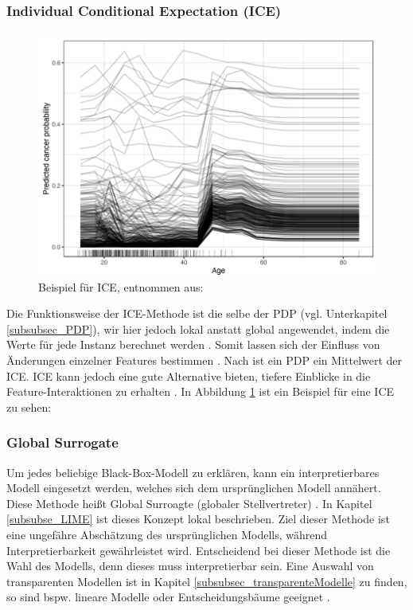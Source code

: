 \subsubsection{Individual Conditional Expectation (ICE)}
\begin{figure}[h]
    \centering
    \includegraphics[scale=0.35]{pic/MA-Bilder/Literaturrecherche/ICE_Beispiel.PNG}
    \caption{Beispiel für ICE, entnommen aus: \cite{ICE-beispiel}}
    \label{Fig:Beispiel_ICE}
\end{figure}
Die Funktionsweise der ICE-Methode ist die selbe der PDP (vgl. Unterkapitel \ref{subsubsec_PDP}), wir hier jedoch lokal anstatt global angewendet, indem die Werte für jede Instanz berechnet werden \cite{molnar2022}. Somit lassen sich der Einfluss von Änderungen einzelner Features bestimmen \cite{hanif2021survey}. Nach \textcite{molnar2022} ist ein PDP ein Mittelwert der ICE. ICE kann jedoch eine gute Alternative bieten, tiefere Einblicke in die Feature-Interaktionen zu erhalten \cite{molnar2022}. In Abbildung \ref{Fig:Beispiel_ICE} ist ein Beispiel für eine ICE zu sehen: 

\subsubsection{Global Surrogate}
Um jedes beliebige Black-Box-Modell zu erklären, kann ein interpretierbares Modell eingesetzt werden, welches sich dem ursprünglichen Modell annähert. Diese Methode heißt Global Surroagte (globaler Stellvertreter) \cite{molnar2022}. In Kapitel \ref{subsubse_LIME} ist dieses Konzept lokal beschrieben. Ziel dieser Methode ist eine ungefähre Abschätzung des ursprünglichen Modells, während Interpretierbarkeit gewährleistet wird. Entscheidend bei dieser Methode ist die Wahl des Modells, denn dieses muss interpretierbar sein. Eine Auswahl von transparenten Modellen ist in Kapitel \ref{subsubsec_transparenteModelle} zu finden, so sind bspw. lineare Modelle oder Entscheidungsbäume geeignet \cite{molnar2022}.

